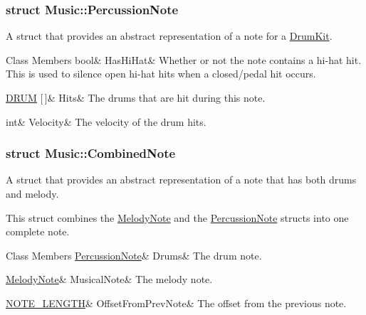 \subsubsection{struct Music\+:\+:Percussion\+Note}
A struct that provides an abstract representation of a note for a \hyperlink{class_drum_kit}{Drum\+Kit}. \begin{DoxyFields}{Class Members}
\mbox{\label{group___enums_a9f4ecb123504d2a6b5406f4bc8e0b882}} 
bool&
HasHiHat&
Whether or not the note contains a hi-\/hat hit. This is used to silence open hi-\/hat hits when a closed/pedal hit occurs. \\
\hline

\mbox{\label{group___enums_a11ba5b49d8ee25941337573029660f25}} 
\hyperlink{group___enums_gade475b4382c7066d1af13e7c13c029b6}{DRUM} \mbox{[}$\,$\mbox{]}&
Hits&
The drums that are hit during this note. \\
\hline

\mbox{\label{group___enums_a98181a53f924736c2df08f886cffed7d}} 
int&
Velocity&
The velocity of the drum hits. \\
\hline

\end{DoxyFields}
\label{struct_music_1_1_combined_note}
\subsubsection{struct Music\+:\+:Combined\+Note}
A struct that provides an abstract representation of a note that has both drums and melody. 

This struct combines the \hyperlink{group___enums_struct_music_1_1_melody_note}{Melody\+Note} and the \hyperlink{group___enums_struct_music_1_1_percussion_note}{Percussion\+Note} structs into one complete note. \begin{DoxyFields}{Class Members}
\mbox{\label{group___enums_a934e18932962add64b76fe34fc705aa3}} 
\hyperlink{group___enums_struct_music_1_1_percussion_note}{PercussionNote}&
Drums&
The drum note. \\
\hline

\mbox{\label{group___enums_ad310b7add1f22dac7cb3d6979a233718}} 
\hyperlink{group___enums_struct_music_1_1_melody_note}{MelodyNote}&
MusicalNote&
The melody note. \\
\hline

\mbox{\label{group___enums_ae281187907aed4c728c7981300dbebaf}} 
\hyperlink{group___enums_gaf11b5f079adbb21c800b9eca1c5c3cbd}{NOTE\_LENGTH}&
OffsetFromPrevNote&
The offset from the previous note. \\
\hline

\end{DoxyFields}
\label{struct_music_1_1_time_signature}
